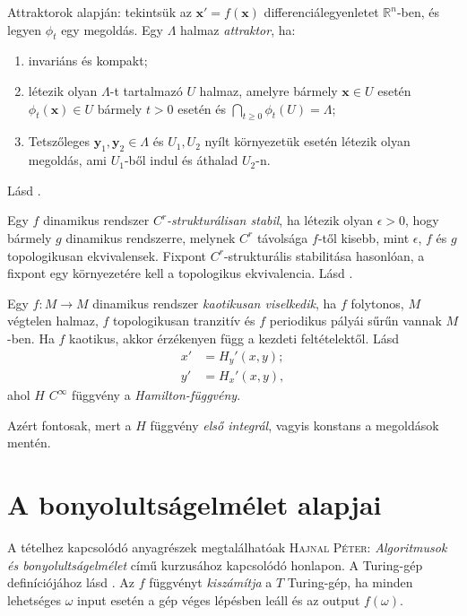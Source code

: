 \documentclass[DIV=15,appendixprefix]{scrreprt}
\theoremstyle{definition}
\theoremstyle{remark}
\begin{document}
Attraktorok \cite[310.~oldal]{DE} alapján: tekintsük az $ \mathbf{ x }' = f \left( \mathbf{ x }
\right) $ differenciálegyenletet $ \mathbb{ R }^{ n } $-ben, és legyen $ \phi_{ t } $ egy megoldás.
Egy $ \Lambda $ halmaz \emph{attraktor}, ha:
\begin{enumerate}
	\item invariáns és kompakt;
	\item létezik olyan $ \Lambda$-t tartalmazó $U$ halmaz, amelyre bármely $ \mathbf{ x } \in
		U $ esetén $ \phi_{ t } \left( \mathbf{ x } \right) \in U $ bármely $ t > 0 $ esetén és
		$ \bigcap_{ t \ge 0 } \phi_{ t } \left( U \right) = \Lambda $;
	\item Tetszőleges $ \mathbf{ y }_{ 1 },{} \mathbf{ y }_{ 2 } \in \Lambda $ és $ U_{ 1 },{}
		U_{ 2 } $ nyílt környezetük esetén létezik olyan megoldás, ami $ U_{ 1 } $-ből indul és
		áthalad $ U_{ 2 } $-n.
\end{enumerate}
%
Lásd \cite[26.~oldal]{Makay}.

Egy $f$ dinamikus rendszer \emph{$C^r$-strukturálisan stabil}, ha létezik olyan $\epsilon >0$, hogy
bármely $g$ dinamikus rendszerre, melynek $C^r$ távolsága $f$-től kisebb, mint $\epsilon$, $f$ és
$g$ topologikusan ekvivalensek. Fixpont $C^r$-strukturális stabilitása hasonlóan, a fixpont egy
környezetére kell a topologikus ekvivalencia.
%
Lásd \cite[30.~oldal]{Makay}.

Egy $f \colon M \rightarrow M $ dinamikus rendszer \emph{kaotikusan viselkedik}, ha $f$ folytonos,
$M$ végtelen halmaz, $f$ topologikusan tranzitív és $f$ periodikus pályái sűrűn vannak $M$-ben. Ha
$f$ kaotikus, akkor érzékenyen függ a kezdeti feltételektől.
%
Lásd \cite[207.~oldal]{DE}
\begin{align*}
	x' &= H_{ y }'\left( x,{} y  \right);\\
	y' &= H_{ x }'\left( x,{} y  \right),
\end{align*}
ahol $H$ $C^\infty$ függvény a \emph{Hamilton-függvény}.

Azért fontosak, mert a $H$ függvény \emph{első integrál}, vagyis konstans a megoldások mentén.
\section{A bonyolultságelmélet alapjai}
A tételhez kapcsolódó anyagrészek megtalálhatóak \textsc{Hajnal Péter}: \emph{Algoritmusok és
bonyolultságelmélet} \cite{Bonya} című kurzusához kapcsolódó honlapon.
%
A Turing-gép definíciójához lásd
\cite[\href{http://www.math.u-szeged.hu/~hajnal/courses/MSc_Bonyolultsag/ea01.pdf}{
\emph{Kiszámíthatóság, Turing-gép, alapfogalmak}}]{Bonya}. Az $f$ függvényt \emph{kiszámítja} a $T$
Turing-gép, ha minden lehetséges $\omega$ input esetén a gép véges lépésben leáll és az output
$ f \left( \omega \right) $.
\end{document}
